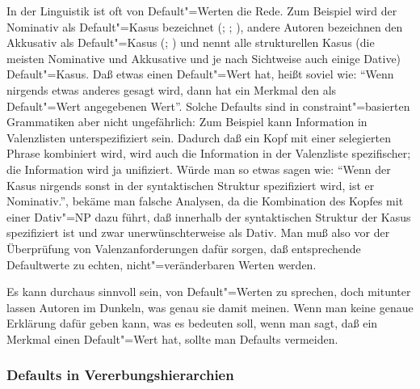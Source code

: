 In der Linguistik ist oft von Default"=Werten die Rede. 
Zum Beispiel wird der Nominativ als Default"=Kasus bezeichnet (\citealp[]{Sternefeld95a}; \citealp[]{Jacobs91a}; \citealp[, 
]{Abraham2005a}), %
andere Autoren bezeichnen den Akkusativ als Default"=Kasus (\citealp[]{Zwicky86};
\citealp[]{Hoeksema91c}) und \citet[]{Wunderlich93a} nennt alle strukturellen Kasus
(\dash die meisten Nominative und Akkusative und je nach Sichtweise auch einige Dative) Default"=Kasus.
%
Daß etwas einen Default"=Wert hat, heißt soviel wie: "`Wenn nirgends etwas anderes gesagt
wird, dann hat ein Merkmal den als Default"=Wert angegebenen Wert"'. Solche Defaults sind
in constraint"=basierten Grammatiken aber nicht ungefährlich: Zum Beispiel kann Information
in Valenzlisten unterspezifiziert sein. Dadurch daß ein Kopf mit einer selegierten Phrase
kombiniert wird, wird auch die Information in der Valenzliste spezifischer; die
Information wird ja unifiziert. Würde man so etwas sagen wie: "`Wenn der Kasus nirgends
sonst in der syntaktischen Struktur spezifiziert wird, ist er Nominativ."', bekäme man falsche
Analysen, da die Kombination des Kopfes mit einer Dativ"=NP dazu führt, daß innerhalb der
syntaktischen Struktur der Kasus spezifiziert ist und zwar unerwünschterweise als Dativ.
Man muß also vor der Überprüfung von Valenzanforderungen dafür sorgen, daß entsprechende
Defaultwerte zu echten, nicht"=veränderbaren Werten werden.

Es kann durchaus sinnvoll sein, von Default"=Werten zu sprechen, doch mitunter lassen Autoren im Dunkeln,
was genau sie damit meinen. Wenn man keine genaue Erklärung dafür geben kann, 
was es bedeuten soll, wenn man sagt, daß ein Merkmal einen Default"=Wert hat,
sollte man Defaults vermeiden.

\subsubsection{Defaults in Vererbungshierarchien}

